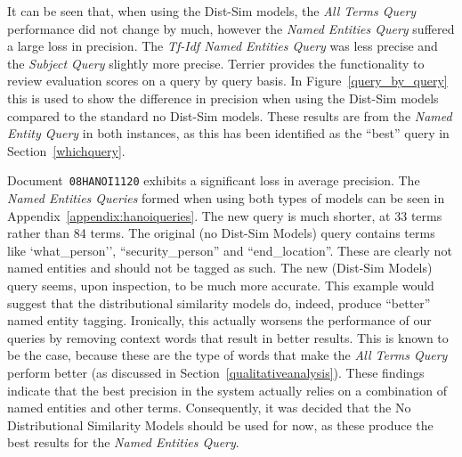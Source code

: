 \documentclass{l4proj}
\newcommand{\code}[1]{\texttt{#1}}
\begin{document}
It can be seen that, when using the Dist-Sim models, the \textit{All Terms Query} performance did not change by much, however the \textit{Named Entities Query} suffered a large loss in precision. The \textit{Tf-Idf Named Entities Query} was less precise and the \textit{Subject Query} slightly more precise.
Terrier provides the functionality to review evaluation scores on a query by query basis. In Figure~\ref{query_by_query} this is used to show the difference in precision when using the Dist-Sim models compared to the standard no Dist-Sim models. These results are from the \textit{Named Entity Query} in both instances, as this has been identified as the ``best'' query in Section~\ref{whichquery}.

Document~\code{08HANOI1120} exhibits a significant loss in average precision. The \textit{Named Entities Queries} formed when using both types of models can be seen in Appendix~\ref{appendix:hanoiqueries}.
The new query is much shorter, at 33 terms rather than 84 terms. The original (no Dist-Sim Models) query contains terms like `what\_person'', ``security\_person'' and ``end\_location''. These are clearly not named entities and should not be tagged as such. The new (Dist-Sim Models) query seems, upon inspection, to be much more accurate. This example would suggest that the distributional similarity models do, indeed, produce ``better'' named entity tagging. Ironically, this actually worsens the performance of our queries by removing context words that result in better results. This is known to be the case, because these are the type of words that make the \textit{All Terms Query} perform better (as discussed in Section~\ref{qualitativeanalysis}).
These findings indicate that the best precision in the system actually relies on a combination of named entities and other terms. Consequently, it was decided that the No Distributional Similarity Models should be used for now, as these produce the best results for the \textit{Named Entities Query}.
\end{document}
